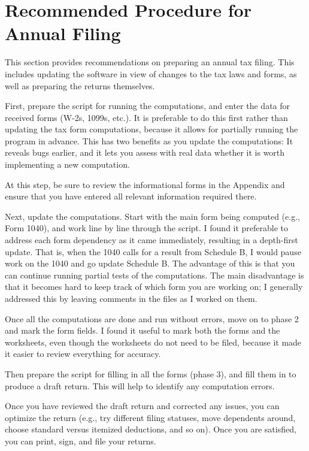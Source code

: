 \documentclass[12pt]{article}
\begin{document}
\section{Recommended Procedure for Annual Filing}

This section provides recommendations on preparing an annual tax filing. This
includes updating the software in view of changes to the tax laws and forms, as
well as preparing the returns themselves.

First, prepare the script for running the computations, and enter the data for
received forms (W-2s, 1099s, etc.). It is preferable to do this first rather
than updating the tax form computations, because it allows for partially running
the program in advance. This has two benefits as you update the computations: It
reveals bugs earlier, and it lets you assess with real data whether it is worth
implementing a new computation.

At this step, be sure to review the informational forms in the Appendix and
ensure that you have entered all relevant information required there.

Next, update the computations. Start with the main form being computed (e.g.,
Form 1040), and work line by line through the script. I found it preferable to
address each form dependency as it came immediately, resulting in a depth-first
update. That is, when the 1040 calls for a result from Schedule B, I would pause
work on the 1040 and go update Schedule B. The advantage of this is that you can
continue running partial tests of the computations. The main disadvantage is
that it becomes hard to keep track of which form you are working on; I generally
addressed this by leaving comments in the files as I worked on them.

Once all the computations are done and run without errors, move on to phase 2
and mark the form fields. I found it useful to mark both the forms and the
worksheets, even though the worksheets do not need to be filed, because it made
it easier to review everything for accuracy.

Then prepare the script for filling in all the forms (phase 3), and fill them in
to produce a draft return. This will help to identify any computation errors.

Once you have reviewed the draft return and corrected any issues, you can
optimize the return (e.g., try different filing statuses, move dependents
around, choose standard versus itemized deductions, and so on). Once you are
satisfied, you can print, sign, and file your returns.
\end{document}
